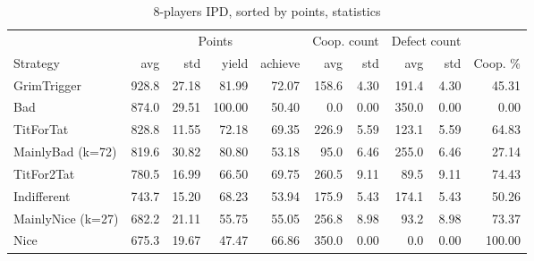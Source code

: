 \documentclass[journal,a4paper,10pt,twoside]{IEEEtran} %
\begin{document}
\begin{table}[ht]
   	\caption{8-players IPD, sorted by points, statistics}
   	\label{tab:ipdmp8}
   	\centering
    \begin{tabular}{l|rrrr|rrrrr} \toprule
    	                  &    \multicolumn{4}{c}{Points}    & \multicolumn{2}{c}{Coop. count} & \multicolumn{2}{c}{Defect count} &          \\
    	Strategy          &   avg &   std &  yield & achieve &   avg &                     std &   avg &                      std & Coop. \% \\ \midrule
    	GrimTrigger       & 928.8 & 27.18 &  81.99 &   72.07 & 158.6 &                    4.30 & 191.4 &                     4.30 &    45.31 \\
    	Bad               & 874.0 & 29.51 & 100.00 &   50.40 &   0.0 &                    0.00 & 350.0 &                     0.00 &     0.00 \\
    	TitForTat         & 828.8 & 11.55 &  72.18 &   69.35 & 226.9 &                    5.59 & 123.1 &                     5.59 &    64.83 \\
    	MainlyBad (k=72)  & 819.6 & 30.82 &  80.80 &   53.18 &  95.0 &                    6.46 & 255.0 &                     6.46 &    27.14 \\
    	TitFor2Tat        & 780.5 & 16.99 &  66.50 &   69.75 & 260.5 &                    9.11 &  89.5 &                     9.11 &    74.43 \\
    	Indifferent       & 743.7 & 15.20 &  68.23 &   53.94 & 175.9 &                    5.43 & 174.1 &                     5.43 &    50.26 \\
    	MainlyNice (k=27) & 682.2 & 21.11 &  55.75 &   55.05 & 256.8 &                    8.98 &  93.2 &                     8.98 &    73.37 \\
    	Nice              & 675.3 & 19.67 &  47.47 &   66.86 & 350.0 &                    0.00 &   0.0 &                     0.00 &   100.00 \\ \bottomrule
    \end{tabular}
\end{table}
\end{document}
